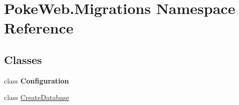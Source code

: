 \hypertarget{namespace_poke_web_1_1_migrations}{}\section{Poke\+Web.\+Migrations Namespace Reference}
\label{namespace_poke_web_1_1_migrations}
\subsection*{Classes}
\begin{DoxyCompactItemize}
\item 
class {\bfseries Configuration}
\item 
class \mbox{\hyperlink{class_poke_web_1_1_migrations_1_1_create_database}{Create\+Database}}
\end{DoxyCompactItemize}
